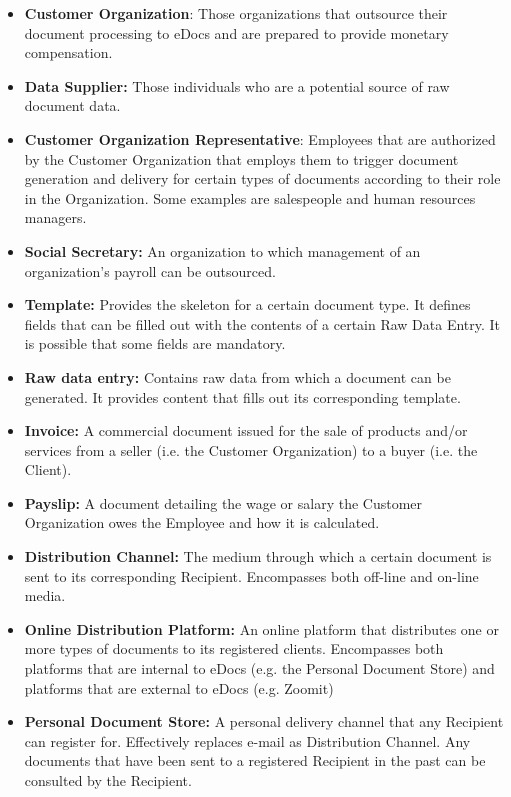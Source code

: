 \documentclass[a4paper,10pt]{article}
\begin{document}
\begin{itemize}
    \item \textbf{Customer Organization}: Those organizations that outsource their document processing to eDocs and are prepared to provide monetary compensation.
    \item \textbf{Data Supplier:} Those individuals who are a potential source of raw document data.
    \item \textbf{Customer Organization Representative}: Employees that are authorized by the Customer Organization that employs them to trigger document generation and delivery for certain types of documents according to their role in the Organization. Some examples are salespeople and human resources managers.
    \item \textbf{Social Secretary:} An organization to which management of an organization's payroll can be outsourced.
    \item \textbf{Template:} Provides the skeleton for a certain document type. It defines fields that can be filled out with the contents of a certain Raw Data Entry. It is possible that some fields are mandatory.
    \item \textbf{Raw data entry:} Contains raw data from which a document can be generated. It provides content that fills out its corresponding template.
    \item \textbf{Invoice:} A commercial document issued for the sale of products and/or services from a seller (i.e. the Customer Organization) to a buyer (i.e. the Client).
    \item \textbf{Payslip:} A document detailing the wage or salary the Customer Organization owes the Employee and how it is calculated.
    \item \textbf{Distribution Channel:} The medium through which a certain document is sent to its corresponding Recipient. Encompasses both off-line and on-line media.
    \item \textbf{Online Distribution Platform:} An online platform that distributes one or more types of documents to its registered clients. Encompasses both platforms that are internal to eDocs (e.g. the Personal Document Store) and platforms that are external to eDocs (e.g. Zoomit)
    \item \textbf{Personal Document Store:} A personal delivery channel that any Recipient can register for. Effectively replaces e-mail as Distribution Channel. Any documents that have been sent to a registered Recipient in the past can be consulted by the Recipient. 
\end{itemize}
\end{document}
